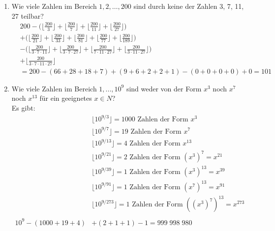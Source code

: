 \begin{enumerate}[label=(\alph*)]
        \item Wie viele Zahlen im Bereich $1, 2,\ldots, 200$ sind durch keine der Zahlen 3, 7, 11, 27 teilbar?\\
        \begin{align*}
	        &200 - \bigg(\bigg\lfloor\frac{200}{3}\bigg\rfloor + \bigg\lfloor\frac{200}{7}\bigg\rfloor
	         + \bigg\lfloor\frac{200}{11}\bigg\rfloor + \bigg\lfloor\frac{200}{27}\bigg\rfloor \bigg) \\
	         &+  \bigg(\bigg\lfloor\frac{200}{21}\bigg\rfloor + \bigg\lfloor\frac{200}{33}\bigg\rfloor 
	         + \bigg\lfloor\frac{200}{81}\bigg\rfloor + \bigg\lfloor\frac{200}{77}\bigg\rfloor
	         + \bigg\lfloor\frac{200}{189}\bigg\rfloor\bigg) \\ 
	         &-\bigg(\bigg\lfloor\frac{200}{3\cdot 7\cdot 11}
	         \bigg\rfloor+\bigg\lfloor\frac{200}{3\cdot 7\cdot 27}\bigg\rfloor + \bigg\lfloor\frac{200}{7\cdot 11\cdot 27}\bigg\rfloor +
	         \bigg\lfloor\frac{200}{3\cdot 11\cdot 27}\bigg\rfloor \bigg)  \\
	         &+ \bigg\lfloor\frac{200}{3\cdot 7\cdot 11 \cdot 27}\bigg\rfloor \\
	         &= 200 - (66+28+18+7) + (9 + 6 + 2 + 2 + 1) - (0 + 0 + 0 + 0) + 0 = 101
        \end{align*}
        \item Wie viele Zahlen im Bereich $1,...,10^9$ sind weder von der Form $x^3$ noch $x^7$ noch $x^{13}$
        für ein geeignetes $x \in N $?\\
         Es gibt: 
	    \begin{align*}
	    &\lfloor 10^{9/3}\rfloor = 1000  \text{ Zahlen der Form } x^3 \\
	    &\lfloor 10^{9/7}\rfloor= 19  \text{ Zahlen der Form }x^7 \\
	    &\lfloor 10^{9/13}\rfloor= 4  \text{ Zahlen der Form }x^{13} \\
	    &\lfloor 10^{9/21}\rfloor= 2  \text{ Zahlen der Form } (x^{3})^7 = x^{21} \\
	    &\lfloor 10^{9/39}\rfloor= 1  \text{ Zahlen der Form } (x^{3})^{13} = x^{39} \\
	    &\lfloor 10^{9/91}\rfloor= 1  \text{ Zahlen der Form } (x^{7})^{13} = x^{91} \\
	    &\lfloor 10^{9/273}\rfloor= 1  \text{ Zahlen der Form } ((x^{3})^7)^{13} = x^{273} \\
	    \\
	    10^9-(1000+19+4)&+(2+1+1)-1=999\; 998\; 980  
        \end{align*}


\end{enumerate}
